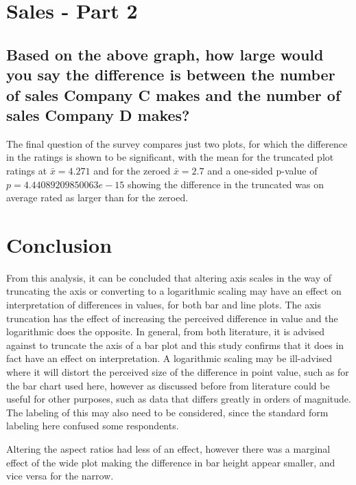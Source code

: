 \documentclass[
]{article}
\newenvironment{Shaded}{\begin{snugshade}}{\end{snugshade}}
\newcommand{\KeywordTok}[1]{\textcolor[rgb]{0.13,0.29,0.53}{\textbf{#1}}}
\newcommand{\NormalTok}[1]{#1}
\newcommand{\OperatorTok}[1]{\textcolor[rgb]{0.81,0.36,0.00}{\textbf{#1}}}
\newcommand{\StringTok}[1]{\textcolor[rgb]{0.31,0.60,0.02}{#1}}
\begin{document}
\section{Sales - Part 2}

\subsection{Based on the above graph, how large would you say the difference is between the number of sales Company C makes and the number of sales Company D makes?}

The final question of the survey compares just two plots, for which the
difference in the ratings is shown to be significant, with the mean for
the truncated plot ratings at \(\bar{x} = 4.271\) and for the zeroed
\(\bar{x} = 2.7\) and a one-sided p-value of \(p=4.44089209850063e-15\)
showing the difference in the truncated was on average rated as larger
than for the zeroed.

\begin{Shaded}
\end{Shaded}

\section{Conclusion}

From this analysis, it can be concluded that altering axis scales in the
way of truncating the axis or converting to a logarithmic scaling may
have an effect on interpretation of differences in values, for both bar
and line plots. The axis truncation has the effect of increasing the
perceived difference in value and the logarithmic does the opposite. In
general, from both literature, it is advised against to truncate the
axis of a bar plot and this study confirms that it does in fact have an
effect on interpretation. A logarithmic scaling may be ill-advised where
it will distort the perceived size of the difference in point value,
such as for the bar chart used here, however as discussed before from
literature could be useful for other purposes, such as data that differs
greatly in orders of magnitude. The labeling of this may also need to be
considered, since the standard form labeling here confused some
respondents.

Altering the aspect ratios had less of an effect, however there was a
marginal effect of the wide plot making the difference in bar height
appear smaller, and vice versa for the narrow.
\end{document}

